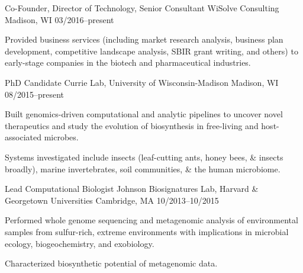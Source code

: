 

\begin{cventries}
  \cventry
    {Co-Founder, Director of Technology, Senior Consultant} %
    {WiSolve Consulting} %
    {Madison, WI} %
    {03/2016--present} %
    {
      \begin{cvitems} %
        \item {Provided business services (including market research analysis, business plan development, competitive landscape analysis, SBIR grant writing, and others) to early-stage companies in the biotech and pharmaceutical industries.}
      \end{cvitems}
    }
    
  \cventry
    {PhD Candidate} %
    {Currie Lab, University of Wisconsin-Madison} %
    {Madison, WI} %
    {08/2015--present} %
    {
      \begin{cvitems} %
        \item {Built genomics-driven computational and analytic pipelines to uncover novel therapeutics and study the evolution of biosynthesis in free-living and host-associated microbes.}
        \item {Systems investigated include insects (leaf-cutting ants, honey bees, \& insects broadly), marine invertebrates, soil communities, \& the human microbiome.}
      \end{cvitems}
    }
    
  \cventry
    {Lead Computational Biologist} %
    {Johnson Biosignatures Lab, Harvard \& Georgetown Universities} %
    {Cambridge, MA} %
    {10/2013--10/2015} %
    {
      \begin{cvitems} %
        \item {Performed whole genome sequencing and metagenomic analysis of environmental samples from sulfur-rich, extreme environments with implications in microbial ecology, biogeochemistry, and exobiology.}
        \item {Characterized biosynthetic potential of metagenomic data.}
      \end{cvitems} 
    }
    

\end{cventries}
